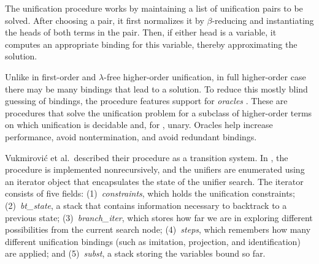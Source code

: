 The unification procedure works by maintaining a list of unification pairs to be solved.
After choosing a pair, it first normalizes it by $\beta$-reducing and
instantiating the heads of both terms in the pair. Then, if either head is a
variable, it computes an appropriate binding for this variable, thereby
approximating the solution.

Unlike in first-order and $\lambda$-free higher-order unification,
in full higher-order case there may be many bindings that lead to a solution. To
reduce this mostly blind guessing of bindings, the procedure features support
for \emph{oracles} \cite{unif-section}. These are procedures that
solve the unification problem for a subclass of higher-order terms on which
unification is decidable and, for \ehohii{}, unary. Oracles help
increase performance, avoid nontermination, and avoid redundant bindings.

Vukmirovi\'c et al.\ described their procedure as a transition system. In
\ehohii{}, the procedure is implemented nonrecursively, and the unifiers are
enumerated using an iterator object that encapsulates the state of the unifier
search. The iterator consists of five fields:
(1)~\emph{constraints}, which holds the unification
constraints;
(2)~\emph{bt\_state}, a stack that contains information necessary to backtrack
to a previous state;
(3)~\emph{branch\_iter}, which stores how far we
are in exploring different possibilities from the current search node;
(4)~\emph{steps}, which remembers how many different unification bindings (such as
imitation, projection, and identification) are applied; and
(5)~\emph{subst},
a stack storing the variables bound so far.

\newcommand{\vn}[1]{\ensuremath{\mathit{#1}}} %
\newcommand{\cn}[1]{\ensuremath{\textsc{#1}}} %
\newcommand{\fc}[1]{\ensuremath{\textsc{#1}}} %
\algrenewcommand{}

